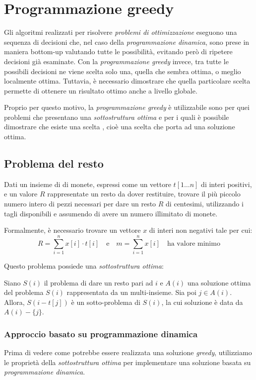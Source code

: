 \chapter{Programmazione greedy}
Gli algoritmi realizzati per risolvere \emph{problemi di ottimizzazione}
eseguono una sequenza di decisioni che, nel caso della \emph{programmazione
dinamica}, sono prese in maniera bottom-up valutando tutte le possibilità,
evitando però di ripetere decisioni già esaminate. Con la \emph{programmazione
greedy} invece, tra tutte le possibili decisioni ne viene scelta solo una,
quella che sembra ottima, o meglio localmente ottima. Tuttavia, è necessario
dimostrare che quella particolare scelta permette di ottenere un risultato
ottimo anche a livello globale.

Proprio per questo motivo, la \emph{programmazione greedy} è utilizzabile sono
per quei problemi che presentano una \emph{sottostruttura ottima} e per i
quali è possibile dimostrare che esiste una scelta , cioè una scelta
che porta ad una soluzione ottima.

\section{Problema del resto}
\begin{problem}
    Dati un insieme di  di monete, espressi come un vettore $t[1\dots n]$
    di interi positivi, e un valore $R$ rappresentate un resto da dover restituire,
    trovare il più piccolo numero intero di pezzi necessari per dare un resto
    $R$ di centesimi, utilizzando i tagli disponibili e assumendo di avere un
    numero illimitato di monete.

    Formalmente, è necessario trovare un vettore $x$ di interi non negativi
    tale per cui:
    \[R=\sum_{i=1}^n x[i]\cdot t[i]\quad\text{e}\quad m=\sum_{i=1}^n x[i]\quad
    \text{ha valore minimo}\]
\end{problem}

\noindent
Questo problema possiede una \emph{sottostruttura ottima}:
\begin{definition}
    Siano $S(i)$ il problema di dare un resto pari ad $i$ e $A(i)$ una soluzione
    ottima del problema $S(i)$ rappresentata da un multi-insieme. Sia poi
    $j\in A(i)$. Allora, $S(i-t[j])$ è un sotto-problema di $S(i)$, la cui
    soluzione è data da $A(i)-\{j\}$.
\end{definition}

\subsection{Approccio basato su programmazione dinamica}
Prima di vedere come potrebbe essere realizzata una soluzione \emph{greedy},
utilizziamo le proprietà della \emph{sottostruttura ottima} per implementare
una soluzione basata su \emph{programmazione dinamica}.

